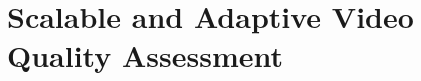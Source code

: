 \chapter{Scalable and Adaptive Video Quality Assessment}
\label{chapter:550_scalable_quality_assessment}






